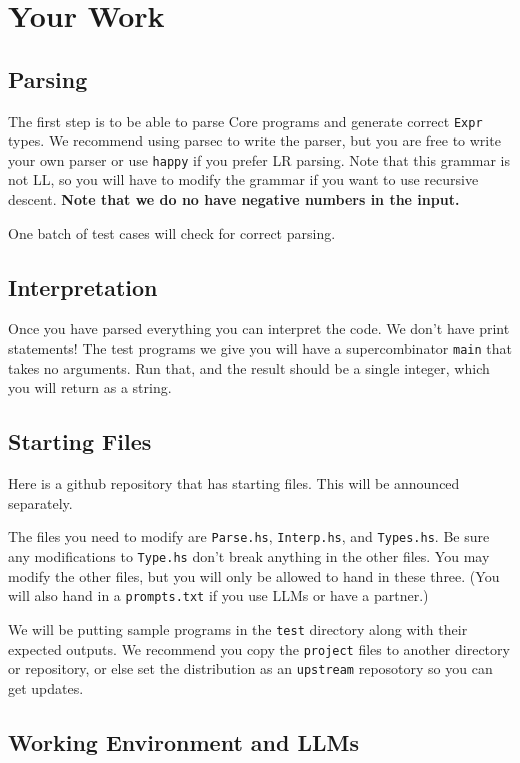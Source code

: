 \documentclass[11pt]{article}
\begin{document}
\section{Your Work}
\label{sec:org27ed090}

\subsection{Parsing}
\label{sec:orgce43c65}

The first step is to be able to parse Core programs and generate correct \texttt{Expr} types.  We recommend using parsec to write the parser,
but you are free to write your own parser or use \texttt{happy} if you prefer LR parsing.  Note that this grammar is not LL, so you will have to
modify the grammar if you want to use recursive descent.  \textbf{Note that we do no have negative numbers in the input.}

One batch of test cases will check for correct parsing.
\subsection{Interpretation}
\label{sec:orgae9bbd2}

Once you have parsed everything you can interpret the code.  We don't have print statements!  The test programs we give you will have a
supercombinator \texttt{main} that takes no arguments.  Run that, and the result should be a single integer, which you will return as a string.
\subsection{Starting Files}
\label{sec:orga11692f}

Here is a github repository that has starting files.  This will be announced separately.

The files you need to modify are \texttt{Parse.hs}, \texttt{Interp.hs}, and \texttt{Types.hs}.  Be sure any modifications to \texttt{Type.hs} don't break anything
in the other files.  You may modify the other files, but you will only be allowed to hand in these three.  (You will also hand in a
\texttt{prompts.txt} if you use LLMs or have a partner.)

We will be putting sample programs in the \texttt{test} directory along with their expected outputs.  We recommend you copy the \texttt{project} files
to another directory or repository, or else set the distribution as an \texttt{upstream} reposotory so you can get updates.
\subsection{Working Environment and LLMs}
\label{sec:orgbec74ca}
\end{document}
